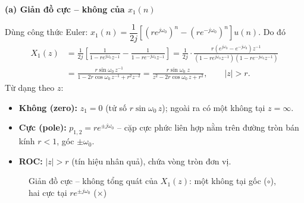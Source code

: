 \documentclass[12pt,a4paper]{article}
\begin{document}
\par\smallskip\noindent\textbf{(a) Giản đồ cực -- không của $x_1(n)$}\par
Dùng công thức Euler: $x_1(n) = \dfrac{1}{2j}\left[(re^{j\omega_0})^n - (re^{-j\omega_0})^n\right]u(n)$. Do đó
\begin{align*}
X_1(z) &= \frac{1}{2j}\left[\frac{1}{1-re^{j\omega_0}z^{-1}} - \frac{1}{1-re^{-j\omega_0}z^{-1}}\right]
 = \frac{1}{2j}\cdot\frac{r\left(e^{j\omega_0}-e^{-j\omega_0}\right)z^{-1}}{(1-re^{j\omega_0}z^{-1})(1-re^{-j\omega_0}z^{-1})} \\
 &= \frac{r\sin\omega_0\, z^{-1}}{1 - 2r\cos\omega_0\, z^{-1} + r^2z^{-2}}
 = \frac{r\sin\omega_0\; z}{z^2 - 2r\cos\omega_0\, z + r^2}, \qquad |z| > r.
\end{align*}
Từ dạng theo $z$:
\begin{itemize}
    \item \textbf{Không (zero):} $z_1 = 0$ (tử số $r\sin\omega_0\, z$); ngoài ra có một không tại $z=\infty$.
    \item \textbf{Cực (pole):} $p_{1,2} = re^{\pm j\omega_0}$ -- cặp cực phức liên hợp nằm trên đường tròn bán kính $r<1$, góc $\pm\omega_0$.
    \item \textbf{ROC:} $|z| > r$ (tín hiệu nhân quả), chứa vòng tròn đơn vị.
\end{itemize}
\begin{figure}[H]
\centering
{}
\caption{Giản đồ cực -- không tổng quát của $X_1(z)$: một không tại gốc ($\circ$), hai cực tại $re^{\pm j\omega_0}$ ($\times$)}
\end{figure}
\end{document}
